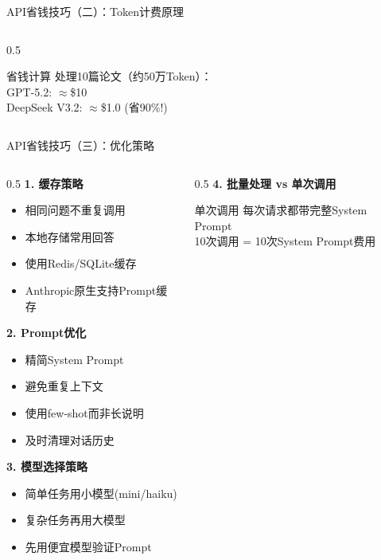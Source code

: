 \documentclass[aspectratio=169,11pt]{beamer}
\begin{document}
\begin{frame}{API省钱技巧（二）：Token计费原理}
\begin{columns}
\begin{column}{0.5\textwidth}
            \vspace{0.3cm}
            \begin{exampleblock}{省钱计算}
                \small
                处理10篇论文（约50万Token）：\\
                GPT-5.2: $\approx$\$10\\
                DeepSeek V3.2: $\approx$\$1.0 \textcolor{green!60!black}{(省90\%!)}
            \end{exampleblock}
        \end{column}
    \end{columns}
\end{frame}

\begin{frame}{API省钱技巧（三）：优化策略}
    \begin{columns}
        \begin{column}{0.5\textwidth}
            \textbf{1. 缓存策略}
            \begin{itemize}
                \item 相同问题不重复调用
                \item 本地存储常用回答
                \item 使用Redis/SQLite缓存
                \item Anthropic原生支持Prompt缓存
            \end{itemize}
            
            \vspace{0.3cm}
            \textbf{2. Prompt优化}
            \begin{itemize}
                \item 精简System Prompt
                \item 避免重复上下文
                \item 使用few-shot而非长说明
                \item 及时清理对话历史
            \end{itemize}
            
            \vspace{0.3cm}
            \textbf{3. 模型选择策略}
            \begin{itemize}
                \item 简单任务用小模型(mini/haiku)
                \item 复杂任务再用大模型
                \item 先用便宜模型验证Prompt
            \end{itemize}
        \end{column}
        \begin{column}{0.5\textwidth}
            \textbf{4. 批量处理 vs 单次调用}
            \begin{block}{单次调用}
                \small
                每次请求都带完整System Prompt\\
                10次调用 = 10次System Prompt费用
            \end{block}
            

\end{column}
\end{columns}
\end{frame}
\end{document}
